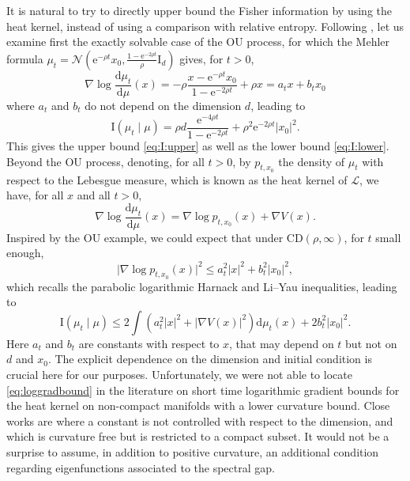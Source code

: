 \documentclass[10pt,reqno]{amsart}
\numberwithin{equation}{section}
\begin{document}
It is natural to try to directly upper bound the Fisher information by using
the heat kernel, instead of using a comparison with relative entropy.
Following \cite{BCL23}, let us examine first the exactly solvable case of the
OU process, for which the Mehler formula
$\mu_t=\mathcal{N}(\mathrm{e}^{-\rho t}x_0,\frac{1-\mathrm{e}^{-2\rho
    t}}{\rho}\mathrm{I}_d)$ gives, for $t>0$,
\begin{equation}
  \nabla\log\frac{\mathrm{d}\mu_t}{\mathrm{d}\mu}(x)
  =-\rho\frac{x-\mathrm{e}^{-\rho t}x_0}{1-\mathrm{e}^{-2\rho t}}+\rho x
  =a_tx+b_tx_0
\end{equation}
where $a_t$ and $b_t$ do not depend on the dimension $d$, leading to
\begin{equation}
  \mathrm{I}(\mu_{t}\mid\mu)
  =\rho d\frac{\mathrm{e}^{-4\rho t}}{1-\mathrm{e}^{-2\rho t}}+\rho^2\mathrm{e}^{-2\rho t}|x_0|^2.
\end{equation}
This gives the upper bound \eqref{eq:I:upper} as well as the lower bound
\eqref{eq:I:lower}. Beyond the OU process, denoting, for all $t>0$, by
$p_{t,x_0}$ the density of $\mu_t$ with respect to the Lebesgue measure, which
is known as the heat kernel of $\mathcal{L}$, we have, for all $x$ and all
$t>0$,
\begin{equation}
  \nabla\log\frac{\mathrm{d}\mu_t}{\mathrm{d}\mu}(x)
  =\nabla\log p_{t,x_0}(x)+\nabla V(x).
\end{equation}
Inspired by the OU example, we could expect that under $\mathrm{CD}(\rho,\infty)$, for $t$ small enough,
\begin{equation}\label{eq:loggradbound}
  \bigl|\nabla\log p_{t,x_0}(x)\bigr|^2
  \leq a_t^2|x|^2+b_t^2|x_0|^2,
\end{equation}
which recalls the parabolic logarithmic Harnack and Li--Yau inequalities, leading to 
\begin{equation}
  \mathrm{I}(\mu_{t}\mid\mu)
  \leq 2\int(a_{t}^2|x|^2+|\nabla V(x)|^2)\mathrm{d}\mu_t(x)+2b_{t}^2|x_0|^2.
\end{equation}
Here $a_t$ and $b_t$ are constants with respect to $x$, that may depend on $t$
but not on $d$ and $x_0$. The explicit dependence on the dimension and initial
condition is crucial here for our purposes. Unfortunately, we were not able to
locate \eqref{eq:loggradbound} in the literature on short time logarithmic
gradient bounds for the heat kernel on non-compact manifolds with a lower
curvature bound. Close works are \cite{MR2253731} where a constant is not
controlled with respect to the dimension, and \cite{MR4546623} which is
curvature free but is restricted to a compact subset. It would not be a
surprise to assume, in addition to positive curvature, an additional condition
regarding eigenfunctions associated to the spectral gap.
\end{document}
